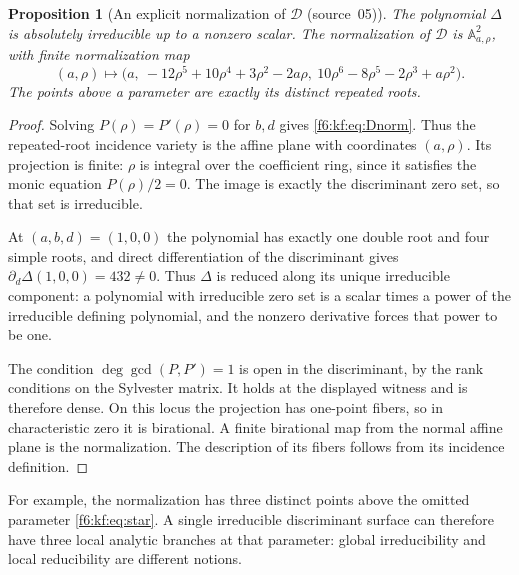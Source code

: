 \documentclass[11pt,a4paper]{article}
\newtheorem{proposition}[theorem]{Proposition}
\theoremstyle{definition}
\newcommand{\A}{\mathbb A}
\newcommand{\dd}{\mathcal D}
\newcommand{\src}[1]{\textup{(source~#1)}}
\begin{document}
\begin{proposition}[An explicit normalization of $\dd$ \src{05}]
\label{f6:kf:prop:Dnorm}
The polynomial $\Delta$ is absolutely irreducible up to a nonzero scalar. The
normalization of $\dd$ is $\A^2_{a,\rho}$, with finite normalization map
\begin{equation}\label{f6:kf:eq:Dnorm}
(a,\rho)\longmapsto
\bigl(a,\ -12\rho^5+10\rho^4+3\rho^2-2a\rho,\
       10\rho^6-8\rho^5-2\rho^3+a\rho^2\bigr).
\end{equation}
The points above a parameter are exactly its distinct repeated roots.
\end{proposition}
\begin{proof}
Solving $P(\rho)=P'(\rho)=0$ for $b,d$ gives \eqref{f6:kf:eq:Dnorm}. Thus the
repeated-root incidence variety is the affine plane with coordinates
$(a,\rho)$. Its projection is finite: $\rho$ is integral over the
coefficient ring, since it satisfies the monic equation $P(\rho)/2=0$. The
image is exactly the discriminant zero set, so that set is irreducible.

At $(a,b,d)=(1,0,0)$ the polynomial has exactly one double root and four
simple roots, and direct differentiation of the discriminant gives
$\partial_d\Delta(1,0,0)=432\ne0$. Thus $\Delta$ is reduced along its unique
irreducible component: a polynomial with irreducible zero set is a scalar
times a power of the irreducible defining polynomial, and the nonzero
derivative forces that power to be one.

The condition $\deg\gcd(P,P')=1$ is open in the discriminant, by the rank
conditions on the Sylvester matrix. It holds at the displayed witness and is
therefore dense. On this locus the projection has one-point fibers, so in
characteristic zero it is birational. A finite birational map from the
normal affine plane is the normalization. The description of its fibers
follows from its incidence definition.
\end{proof}

For example, the normalization has three distinct points above the omitted
parameter \eqref{f6:kf:eq:star}. A single irreducible discriminant surface can
therefore have three local analytic branches at that parameter: global
irreducibility and local reducibility are different notions.
\end{document}
